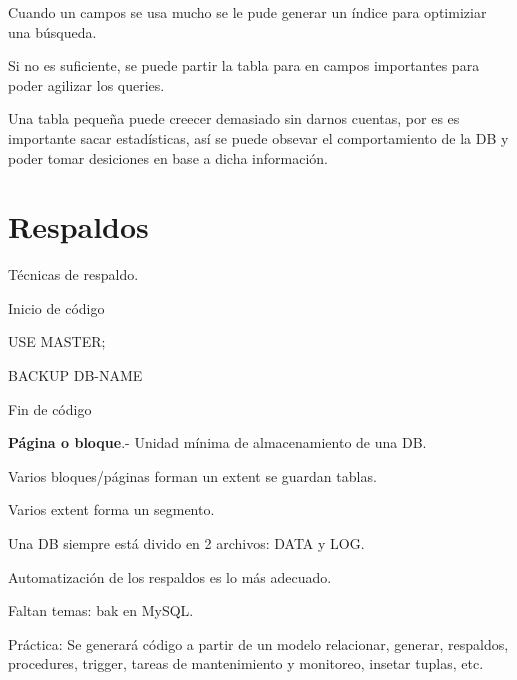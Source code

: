 \documentclass{article}
\begin{document}
Cuando un campos se usa mucho se le pude generar un índice para optimiziar
una búsqueda.
\vspace{1em}

Si no es suficiente, se puede partir la tabla para en campos importantes
para poder agilizar los queries.
\vspace{1em}

Una tabla pequeña puede creecer demasiado sin darnos cuentas, por es
es importante sacar estadísticas, así se puede obsevar el comportamiento
de la DB y poder tomar desiciones en base a dicha información.
\vspace{1em}

\section{Respaldos}

Técnicas de respaldo.
\vspace{1em}

Inicio de código

USE MASTER;

BACKUP DB-NAME

Fin de código
\vspace{1em}

\textbf{Página o bloque}.- Unidad mínima de almacenamiento de una DB.

Varios bloques/páginas forman un extent se guardan tablas.

Varios extent forma un segmento.
\vspace{1em}

Una DB siempre está divido en 2 archivos: DATA y LOG.
\vspace{1em}

Automatización de los respaldos es lo más adecuado.
\vspace{1em}

Faltan temas: bak en MySQL.

Práctica: Se generará código a partir de un modelo relacionar, generar, respaldos,
procedures, trigger, tareas de mantenimiento y monitoreo, insetar tuplas, etc.
\end{document}
